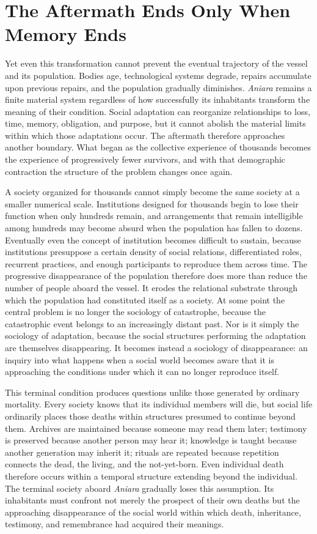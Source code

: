 \documentclass[11pt,oneside]{book}
\theoremstyle{definition}
\theoremstyle{remark}
\begin{document}
\section{The Aftermath Ends Only When Memory Ends}

Yet even this transformation cannot prevent the eventual trajectory of the vessel and its population. Bodies age, technological systems degrade, repairs accumulate upon previous repairs, and the population gradually diminishes. \emph{Aniara} remains a finite material system regardless of how successfully its inhabitants transform the meaning of their condition. Social adaptation can reorganize relationships to loss, time, memory, obligation, and purpose, but it cannot abolish the material limits within which those adaptations occur. The aftermath therefore approaches another boundary. What began as the collective experience of thousands becomes the experience of progressively fewer survivors, and with that demographic contraction the structure of the problem changes once again.

A society organized for thousands cannot simply become the same society at a smaller numerical scale. Institutions designed for thousands begin to lose their function when only hundreds remain, and arrangements that remain intelligible among hundreds may become absurd when the population has fallen to dozens. Eventually even the concept of institution becomes difficult to sustain, because institutions presuppose a certain density of social relations, differentiated roles, recurrent practices, and enough participants to reproduce them across time. The progressive disappearance of the population therefore does more than reduce the number of people aboard the vessel. It erodes the relational substrate through which the population had constituted itself as a society. At some point the central problem is no longer the sociology of catastrophe, because the catastrophic event belongs to an increasingly distant past. Nor is it simply the sociology of adaptation, because the social structures performing the adaptation are themselves disappearing. It becomes instead a sociology of disappearance: an inquiry into what happens when a social world becomes aware that it is approaching the conditions under which it can no longer reproduce itself.

This terminal condition produces questions unlike those generated by ordinary mortality. Every society knows that its individual members will die, but social life ordinarily places those deaths within structures presumed to continue beyond them. Archives are maintained because someone may read them later; testimony is preserved because another person may hear it; knowledge is taught because another generation may inherit it; rituals are repeated because repetition connects the dead, the living, and the not-yet-born. Even individual death therefore occurs within a temporal structure extending beyond the individual. The terminal society aboard \emph{Aniara} gradually loses this assumption. Its inhabitants must confront not merely the prospect of their own deaths but the approaching disappearance of the social world within which death, inheritance, testimony, and remembrance had acquired their meanings.
\end{document}
